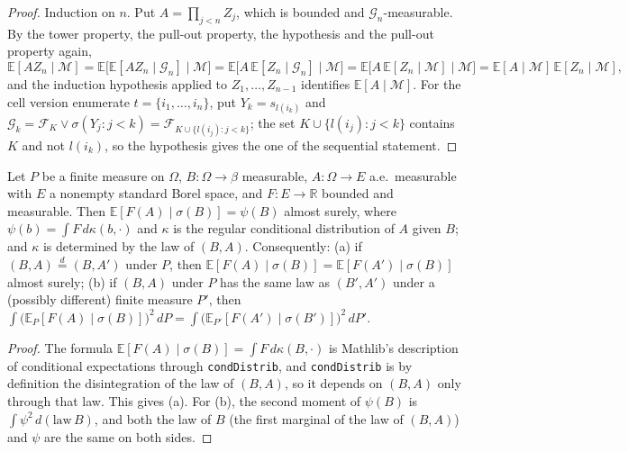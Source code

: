 \begin{proof}
  \leanok
Induction on $n$. Put $A=\prod_{j<n}Z_j$, which is bounded and $\mathscr G_n$-measurable. By the tower property, the pull-out property, the hypothesis and the pull-out property again,
\[\mathbb E[AZ_n\mid\mathscr M]=\mathbb E\big[\mathbb E[AZ_n\mid\mathscr G_n]\mid\mathscr M\big]=\mathbb E\big[A\,\mathbb E[Z_n\mid\mathscr G_n]\mid\mathscr M\big]=\mathbb E\big[A\,\mathbb E[Z_n\mid\mathscr M]\mid\mathscr M\big]=\mathbb E[A\mid\mathscr M]\,\mathbb E[Z_n\mid\mathscr M],\]
and the induction hypothesis applied to $Z_1,\dots,Z_{n-1}$ identifies $\mathbb E[A\mid\mathscr M]$.
For the cell version enumerate $t=\{i_1,\dots,i_n\}$, put $Y_k=s_{l(i_k)}$ and $\mathscr G_k=\mathscr F_K\vee\sigma(Y_j:j<k)=\mathscr F_{K\cup\{l(i_j):j<k\}}$; the set $K\cup\{l(i_j):j<k\}$ contains $K$ and not $l(i_k)$, so the hypothesis gives the one of the sequential statement.
\end{proof}

\begin{lemma}\label{lem:sg:condexp-law}
  \leanok
Let $P$ be a finite measure on $\Omega$, $B:\Omega\to\beta$ measurable, $A:\Omega\to E$ a.e.\ measurable with $E$ a nonempty standard Borel space, and $F:E\to\mathbb R$ bounded and measurable. Then
$\mathbb E[F(A)\mid\sigma(B)]=\psi(B)$ almost surely, where $\psi(b)=\int F\,d\kappa(b,\cdot)$ and $\kappa$ is the regular conditional distribution of $A$ given $B$; and $\kappa$ is determined by the law of $(B,A)$.
Consequently:
(a) if $(B,A)\overset d=(B,A')$ under $P$, then $\mathbb E[F(A)\mid\sigma(B)]=\mathbb E[F(A')\mid\sigma(B)]$ almost surely;
(b) if $(B,A)$ under $P$ has the same law as $(B',A')$ under a (possibly different) finite measure $P'$, then
$\int\big(\mathbb E_P[F(A)\mid\sigma(B)]\big)^2\,dP=\int\big(\mathbb E_{P'}[F(A')\mid\sigma(B')]\big)^2\,dP'$.
\end{lemma}

\begin{proof}
  \leanok
The formula $\mathbb E[F(A)\mid\sigma(B)]=\int F\,d\kappa(B,\cdot)$ is Mathlib's description of conditional expectations through \texttt{condDistrib}, and \texttt{condDistrib} is by definition the disintegration of the law of $(B,A)$,
so it depends on $(B,A)$ only through that law. This gives (a). For (b), the second moment of $\psi(B)$ is $\int\psi^2\,d(\mathrm{law}\,B)$, and both the law of $B$ (the first marginal of the law of $(B,A)$) and $\psi$ are the same on both sides.
\end{proof}

